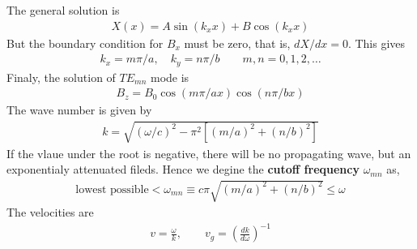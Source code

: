 \documentclass{article}
\begin{document}
        The general solution is
        \begin{align}
            X(x) = A \sin{(k_x x)} + B \cos{(k_x x)}
        \end{align}
        But the boundary condition for $B_x$ must be zero, that is, $dX/dx=0$. This gives 
        \begin{align}
            k_x=m\pi / a, \quad k_y= n\pi/ b \qquad m, n=0, 1, 2, \dots
        \end{align}
        Finaly, the solution of $TE_{mn}$ mode is
        \begin{align}
            B_z = B_0 \cos{(m\pi / ax)} \cos{(n\pi /bx)}
        \end{align}
        The wave number is given by
        \begin{align}
            k= \sqrt{(\omega/c)^2 -\pi^2 [(m/a)^2 + (n/b)^2]}
        \end{align}
        If the vlaue under the root is negative, there will be no propagating wave, but an
        exponentialy attenuated fileds. Hence we degine the \textbf{cutoff frequency} $\omega_{mn}$
        as, 
        \begin{align}
            \text{lowest possible} < \omega_{mn} \equiv c\pi\sqrt{(m/a)^2 + (n/b)^2} \le \omega
        \end{align}
        The velocities are
        \begin{align}
            v=\frac{\omega}{k}, \qquad v_g= \left( \frac{dk}{d\omega} \right)^{-1}
        \end{align}
\end{document}
